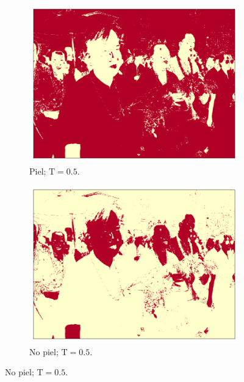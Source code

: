 \begin{figure}[ht!]
\begin{subfigure}{0.4\textwidth}
    \end{subfigure}
    \begin{subfigure}{0.4\textwidth}
        \centering
        \includegraphics[width=\textwidth]{../figures/image1/image_01_treshskin_50percent.png}
        \caption{Piel; $\text{T} = 0.5$.}
        \label{fig:training_treshskin_5}
    \end{subfigure}
    \hspace{1cm}
    \begin{subfigure}{0.4\textwidth}
        \centering
        \includegraphics[width=\textwidth]{../figures/image1/image_01_treshbg_50percent.png}
        \caption{No piel; $\text{T} = 0.5$.}
        \label{fig:training_treshbg_5}

\end{subfigure}
\end{figure}
